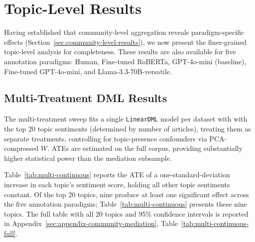 \section{Topic-Level Results}
\label{sec:topic-level-results}

Having established that community-level aggregation reveals paradigm-specific effects (Section~\ref{sec:community-level-results}), we now present the finer-grained topic-level analysis for completeness. These results are also available for five annotation paradigms: Human, Fine-tuned RoBERTa, GPT-4o-mini (baseline), Fine-tuned GPT-4o-mini, and Llama-3.3-70B-versatile.
\subsection{Multi-Treatment DML Results}
\label{sec:multi-treatment-results}

The multi-treatment sweep fits a single \texttt{LinearDML} model per dataset with with the top 20 topic sentiments (determined by number of articles), treating them as separate treatments, controlling for topic-presence confounders via PCA-compressed $W$. ATEs are estimated on the full corpus, providing substantially higher statistical power than the mediation subsample.

Table~\ref{tab:multi-continuous} reports the ATE of a one-standard-deviation increase in each topic's sentiment score, holding all other topic sentiments constant. Of the top 20 topics, nine produce at least one significant effect across the five annotation paradigms; Table~\ref{tab:multi-continuous} presents these nine topics. The full table with all 20 topics and 95\% confidence intervals is reported in Appendix~\ref{sec:appendix-community-mediation}, Table~\ref{tab:multi-continuous-full}.

